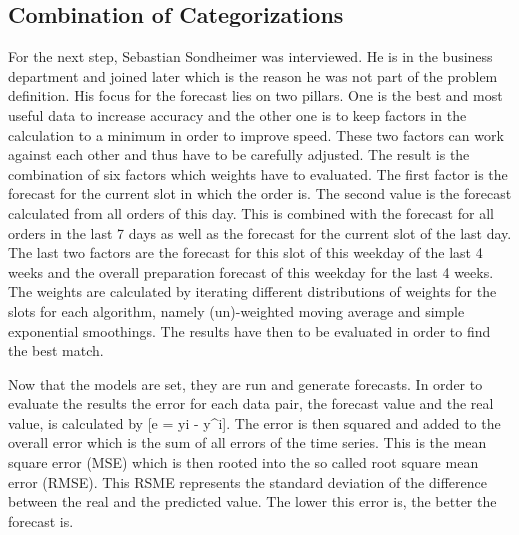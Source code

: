 \subsection{Combination of Categorizations}\label{subsection:Categorizing by Order}
For the next step, Sebastian Sondheimer was interviewed. He is in the business department and joined later which is the reason he was not part of the problem definition. His focus for the forecast lies on two pillars. One is the best and most useful data to increase accuracy and the other one is to keep factors in the calculation to a minimum in order to improve speed. These two factors can work against each other and thus have to be carefully adjusted. The result is the combination of six factors which weights have to evaluated. The first factor is the forecast for the current slot in which the order is. The second value is the forecast calculated from all orders of this day. This is combined with the forecast for all orders in the last 7 days as well as the forecast for the current slot of the last day. The last two factors are the forecast for this slot of this weekday of the last 4 weeks and the overall preparation forecast of this weekday for the last 4 weeks. The weights are calculated by iterating different distributions of weights for the slots for each algorithm, namely (un)-weighted moving average and simple exponential smoothings. The results have then to be evaluated in order to find the best match.

Now that the models are set, they are run and generate forecasts. In order to evaluate the results the error for each data pair, the forecast value and the real value, is calculated by [e = yi - y^i]. The error is then squared and added to the overall error which is the sum of all errors of the time series. This is the mean square error (MSE) which is then rooted into the so called root square mean error (RMSE). This RSME represents the standard deviation of the difference between the real and the predicted value. The lower this error is, the better the forecast is.
